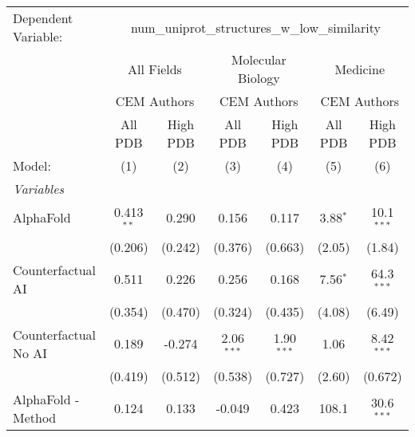 \begingroup
\centering
\begin{tabular}{lcccccc}
   \tabularnewline \midrule \midrule
   Dependent Variable: & \multicolumn{6}{c}{num\_uniprot\_structures\_w\_low\_similarity}\\
 & \multicolumn{2}{c}{All Fields} & \multicolumn{2}{c}{Molecular Biology} & \multicolumn{2}{c}{Medicine} \\
\cmidrule(lr){2-3} \cmidrule(lr){4-5} \cmidrule(lr){6-7}
 & \multicolumn{2}{c}{CEM Authors} & \multicolumn{2}{c}{CEM Authors} & \multicolumn{2}{c}{CEM Authors} \\
\cmidrule(lr){2-3} \cmidrule(lr){4-5} \cmidrule(lr){6-7}
 & \multicolumn{1}{c}{All PDB} & \multicolumn{1}{c}{High PDB} & \multicolumn{1}{c}{All PDB} & \multicolumn{1}{c}{High PDB} & \multicolumn{1}{c}{All PDB} & \multicolumn{1}{c}{High PDB} \\
\cmidrule(lr){2-2} \cmidrule(lr){3-3} \cmidrule(lr){4-4} \cmidrule(lr){5-5} \cmidrule(lr){6-6} \cmidrule(lr){7-7}
   Model:                                                     & (1)           & (2)           & (3)          & (4)           & (5)        & (6)\\  
   \midrule
   \emph{Variables}\\
   AlphaFold                                                  & 0.413$^{**}$  & 0.290         & 0.156        & 0.117         & 3.88$^{*}$ & 10.1$^{***}$\\   
                                                              & (0.206)       & (0.242)       & (0.376)      & (0.663)       & (2.05)     & (1.84)\\   
   Counterfactual AI                                          & 0.511         & 0.226         & 0.256        & 0.168         & 7.56$^{*}$ & 64.3$^{***}$\\   
                                                              & (0.354)       & (0.470)       & (0.324)      & (0.435)       & (4.08)     & (6.49)\\   
   Counterfactual No AI                                       & 0.189         & -0.274        & 2.06$^{***}$ & 1.90$^{***}$  & 1.06       & 8.42$^{***}$\\   
                                                              & (0.419)       & (0.512)       & (0.538)      & (0.727)       & (2.60)     & (0.672)\\   
   AlphaFold - Method                                         & 0.124         & 0.133         & -0.049       & 0.423         & 108.1      & 30.6$^{***}$\\   

\end{tabular}
